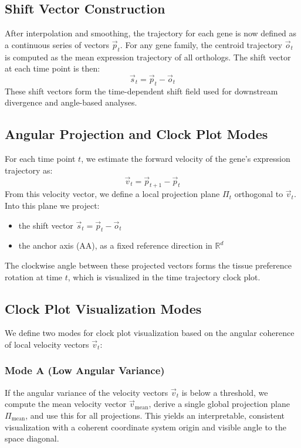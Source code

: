 \documentclass{article}
\begin{document}
\subsection{Shift Vector Construction}

After interpolation and smoothing, the trajectory for each gene is now defined as a continuous series of vectors \( \vec{p}_t \). For any gene family, the centroid trajectory \( \vec{o}_t \) is computed as the mean expression trajectory of all orthologs. The shift vector at each time point is then:
\[
\vec{s}_t = \vec{p}_t - \vec{o}_t
\]
These shift vectors form the time-dependent shift field used for downstream divergence and angle-based analyses.

\subsection{Angular Projection and Clock Plot Modes}

For each time point \( t \), we estimate the forward velocity of the gene's expression trajectory as:
\[
\vec{v}_t = \vec{p}_{t+1} - \vec{p}_t
\]
From this velocity vector, we define a local projection plane \( \Pi_t \) orthogonal to \( \vec{v}_t \). Into this plane we project:

\begin{itemize}
    \item the shift vector \( \vec{s}_t = \vec{p}_t - \vec{o}_t \)
    \item the anchor axis (AA), as a fixed reference direction in \( \mathbb{R}^d \)
\end{itemize}

The clockwise angle between these projected vectors forms the tissue preference rotation at time \( t \), which is visualized in the time trajectory clock plot.

\subsection{Clock Plot Visualization Modes}

We define two modes for clock plot visualization based on the angular coherence of local velocity vectors \( \vec{v}_t \):

\subsubsection*{Mode A (Low Angular Variance)}

If the angular variance of the velocity vectors \( \vec{v}_t \) is below a threshold, we compute the mean velocity vector \( \vec{v}_{\text{mean}} \), derive a single global projection plane \( \Pi_{\text{mean}} \), and use this for all projections. This yields an interpretable, consistent visualization with a coherent coordinate system origin and visible angle to the space diagonal.
\end{document}

